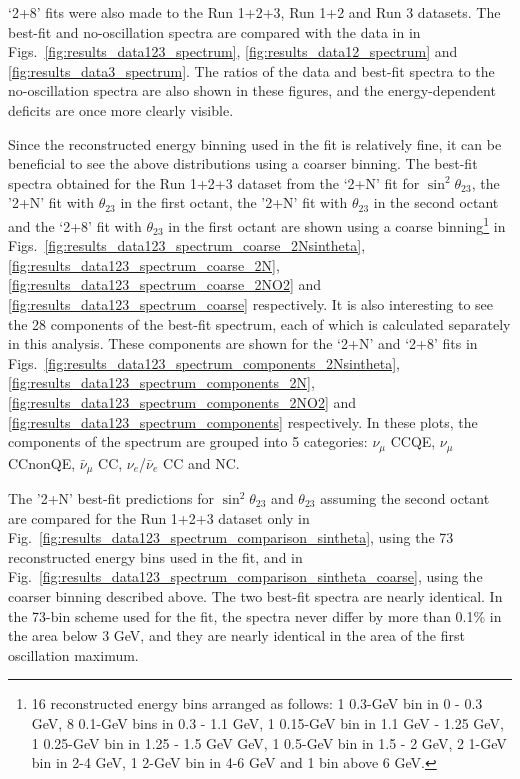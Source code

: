 `2+8' fits were also made to the Run 1+2+3, Run 1+2 and Run 3 datasets. The best-fit and no-oscillation spectra are compared with 
the data in in Figs.\
\ref{fig:results_data123_spectrum},  
\ref{fig:results_data12_spectrum} and
\ref{fig:results_data3_spectrum}.
The ratios of the data and best-fit spectra to the no-oscillation spectra are also shown in these figures, and the energy-dependent 
deficits are once more clearly visible. 

Since the reconstructed energy binning used in the fit is relatively fine, it can be beneficial to see the above distributions using 
a coarser binning. The best-fit spectra obtained for the Run 1+2+3 dataset from the `2+N' fit for $\sin^2\theta_{23}$,
the '2+N' fit with $\theta_{23}$ in the first octant, 
the '2+N' fit with $\theta_{23}$ in the second octant and the `2+8' fit with $\theta_{23}$ in the first octant are shown using a coarse 
binning\footnote{
  16 reconstructed energy bins arranged as follows:
  1 0.3-GeV bin in 0 - 0.3 GeV,
  8 0.1-GeV bins in 0.3 - 1.1 GeV,
  1 0.15-GeV bin in 1.1 GeV - 1.25 GeV,
  1 0.25-GeV bin in 1.25 - 1.5 GeV GeV,
  1 0.5-GeV bin in 1.5 - 2 GeV,
  2 1-GeV bin in 2-4 GeV,
  1 2-GeV bin in 4-6 GeV and 1 bin above 6 GeV.
} 
in Figs.\
\ref{fig:results_data123_spectrum_coarse_2Nsintheta},
\ref{fig:results_data123_spectrum_coarse_2N},
\ref{fig:results_data123_spectrum_coarse_2NO2} and
\ref{fig:results_data123_spectrum_coarse}
respectively. It is also interesting to see the 28 components of the best-fit spectrum, each of which is calculated separately 
in this analysis. These components are shown for the `2+N' and `2+8' 
fits in Figs.\ 
\ref{fig:results_data123_spectrum_components_2Nsintheta},
\ref{fig:results_data123_spectrum_components_2N},
\ref{fig:results_data123_spectrum_components_2NO2} and
\ref{fig:results_data123_spectrum_components} respectively.
In these plots, the components of the spectrum are grouped into 5 categories: 
$\nu_{\mu}$ CCQE, $\nu_{\mu}$ CCnonQE, $\bar{\nu}_{\mu}$ CC, $\nu_{e}$/$\bar{\nu}_{e}$ CC and NC.

The '2+N' best-fit predictions for $\sin^2\theta_{23}$ and $\theta_{23}$ assuming the second octant
are compared for the Run 1+2+3 dataset only in  
Fig.\ \ref{fig:results_data123_spectrum_comparison_sintheta}, 
using the 73 reconstructed energy bins used in the fit, and in
Fig.\ \ref{fig:results_data123_spectrum_comparison_sintheta_coarse},
using the coarser binning described above.
The two best-fit spectra are nearly identical. In the 73-bin scheme used for the fit,
the spectra never differ by more than 0.1\% in the area below 3 GeV,
and they are nearly identical in the area of the first oscillation maximum.

